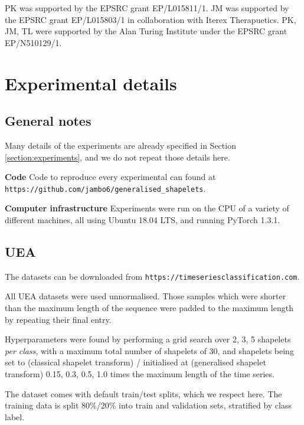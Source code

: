 \documentclass{article}
\theoremstyle{plain}
\theoremstyle{definition}
\newcommand{\boldheading}[1]{

\textbf{#1}\quad}
\begin{document}
	
	\begin{ack}
	PK was supported by the EPSRC grant EP/L015811/1. JM was supported by the EPSRC grant EP/L015803/1 in collaboration with Iterex Therapuetics. PK, JM, TL were supported by the Alan Turing Institute under the EPSRC grant EP/N510129/1.
	\end{ack}
	
	\small
	
	 
	
	\normalsize
	\newpage
	\appendix
	
	\section{Experimental details}\label{appendix:experimental}
	\subsection{General notes}
	Many details of the experiments are already specified in Section \ref{section:experiments}, and we do not repeat those details here.
	
	\boldheading{Code} Code to reproduce every experimental can found at \texttt{https://github.com/jambo6/generalised\_shapelets}.
	
	\boldheading{Computer infrastructure} Experiments were run on the CPU of a variety of different machines, all using Ubuntu 18.04 LTS, and running PyTorch 1.3.1.
	
	\subsection{UEA}
	The datasets can be downloaded from \texttt{https://timeseriesclassification.com}.
	
	All UEA datasets were used unnormalised. Those samples which were shorter than the maximum length of the sequence were padded to the maximum length by repeating their final entry.
	
	Hyperparameters were found by performing a grid search over 2, 3, 5 shapelets \emph{per class}, with a maximum total number of shapelets of 30, and shapelets being set to (classical shapelet transform) / initialised at (generalised shapelet transform) 0.15, 0.3, 0.5, 1.0 times the maximum length of the time series.
	
	The dataset comes with default train/test splits, which we respect here. The training data is split 80\%/20\% into train and validation sets, stratified by class label.
	
\end{document}
